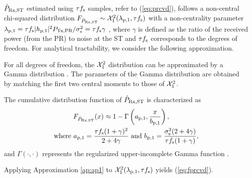 $\hat{P}_{\text{Rx,ST}}$ estimated using $\tau f_{\text{s}}$ samples, refer to (\ref{eq:prcvd}), follows a non-central chi-squared distribution $\fprcvd \sim \ncchi2(\lpo, \tau \fsam)$ with a non-centrality parameter $\lambda_{\text{p,1}} = \tau f_{\text{s}} |h_{\text{p,1}}|^2 P_{\text{Tx,PR}} /\sigma^2_{\text{s}} = \tau f_{\text{s}} \gamma$ \cite{Kay}, where $\gamma$ is defined as the ratio of the received power (from the PR) to noise at the ST and $\tau f_{\text{s}}$ corresponds to the degrees of freedom. For analytical tractability, we consider the following approximation. 
\begin{approxi} \label{ap:ap1}
\normalfont
For all degrees of freedom, the $\ncchi2$ distribution can be approximated by a Gamma distribution \cite{abramo}. The parameters of the Gamma distribution are obtained by matching the first two central moments to those of $\ncchi2$.
\end{approxi}
\begin{lemma} \label{lm:lm1}
\normalfont
The cumulative distribution function of $\hat{P}_{\text{Rx,ST}}$ is characterized as 
\begin{align}
F_{\hat{P}_{\text{Rx,ST}}}(x) \approx 1 - \Gamma&\left(a_{\text{p,1}}, \frac{x}{b_{\text{p,1}}}\right) \label{eq:fprcvd}, \\ 
\text{where  } a_{\text{p,1}} = \frac{\tau f_{\text{s}} (1 + \gamma)^2}{2 + 4 \gamma} &\text{ and } b_{\text{p,1}} = \frac{\sigma^2_{\text{s}} (2 + 4 \gamma)}{\tau f_{\text{s}} (1 + \gamma)},  \label{eq:para_po} 
\end{align} 
and $\Gamma(\cdot, \cdot)$ represents the regularized upper-incomplete Gamma function \cite{abramo}. 
\end{lemma}
\begin{IEEEproof}
Applying Approximation \ref{ap:ap1} to $\ncchi2(\lpo, \tau \fsam)$ yields (\ref{eq:fprcvd}). 
\end{IEEEproof}

